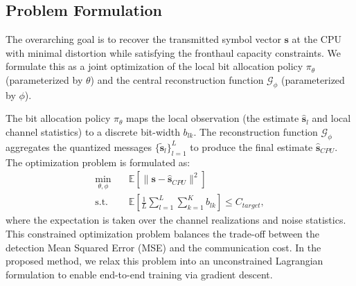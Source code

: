 \subsection{Problem Formulation}
The overarching goal is to recover the transmitted symbol vector $\mathbf{s}$ at the CPU with minimal distortion while satisfying the fronthaul capacity constraints. We formulate this as a joint optimization of the local bit allocation policy $\pi_{\theta}$ (parameterized by $\theta$) and the central reconstruction function $\mathcal{G}_{\phi}$ (parameterized by $\phi$).

The bit allocation policy $\pi_{\theta}$ maps the local observation (the estimate $\hat{\mathbf{s}}_l$ and local channel statistics) to a discrete bit-width $b_{lk}$. The reconstruction function $\mathcal{G}_{\phi}$ aggregates the quantized messages $\{\tilde{\mathbf{s}}_l\}_{l=1}^L$ to produce the final estimate $\hat{\mathbf{s}}_{CPU}$. The optimization problem is formulated as:
\begin{subequations}
\begin{align}
    \min_{\theta, \phi} \quad & \mathbb{E} \left[ \| \mathbf{s} - \hat{\mathbf{s}}_{CPU} \|^2 \right] \\
    \text{s.t.} \quad & \mathbb{E} \left[ \frac{1}{L} \sum_{l=1}^L \sum_{k=1}^K b_{lk} \right] \le C_{target},
\end{align}
\end{subequations}
where the expectation is taken over the channel realizations and noise statistics. This constrained optimization problem balances the trade-off between the detection Mean Squared Error (MSE) and the communication cost. In the proposed method, we relax this problem into an unconstrained Lagrangian formulation to enable end-to-end training via gradient descent.